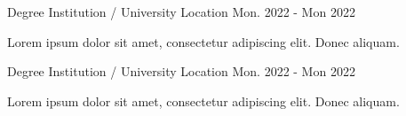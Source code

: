 

\begin{cventries}

  \cventry
   {Degree} %
    {Institution / University} %
    {Location} %
    {Mon. 2022 - Mon 2022} %
    {
      \begin{cvitems} %
         \item {Lorem ipsum dolor sit amet, consectetur adipiscing elit. Donec aliquam.}
      \end{cvitems}
    }

  \cventry
    {Degree} %
    {Institution / University} %
    {Location} %
    {Mon. 2022 - Mon 2022} %
    {
      \begin{cvitems} %
         \item {Lorem ipsum dolor sit amet, consectetur adipiscing elit. Donec aliquam.}
      \end{cvitems}
    }

\end{cventries}

